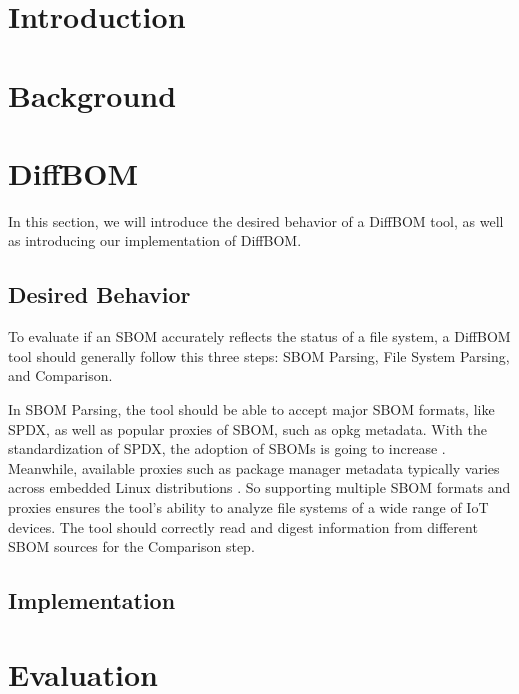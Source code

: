 \section{Introduction}


\section{Background}


\section{DiffBOM}

In this section, we will introduce the desired behavior of a DiffBOM tool, as well as introducing our implementation of DiffBOM.
\subsection{Desired Behavior}
To evaluate if an SBOM accurately reflects the status of a file system, a DiffBOM tool should generally follow this three steps: SBOM Parsing, File System Parsing, and Comparison.\par
In SBOM Parsing, the tool should be able to accept major SBOM formats, like SPDX, as well as popular proxies of SBOM, such as opkg metadata. With the standardization of SPDX, the adoption of SBOMs is going to increase \cite{1}. Meanwhile, available proxies such as package manager metadata typically varies across embedded Linux distributions \cite{1}. So supporting multiple SBOM formats and proxies ensures the tool's ability to analyze file systems of a wide range of IoT devices. The tool should correctly read and digest information from different SBOM sources for the Comparison step.

\subsection{Implementation} 

\section{Evaluation}

